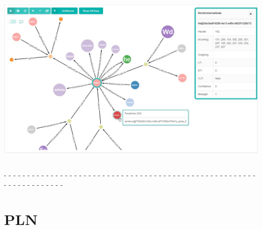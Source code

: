 \documentclass[aspectratio=169]{beamer}
\begin{document}
\begin{frame}
\begin{columns}
    \includegraphics[scale=0.2]{images/ng2-atomspace-visualizer.jpg}

  \end{columns}

  - - - - - - - - - - - - - - - - - - - - - - - - - - - - - - - - - -
  - - - - - - - - - - - - - - - - - - - - - - - - - - - - - - - - -\\[0.1cm]

\end{frame}

\section {PLN}
\end{document}
